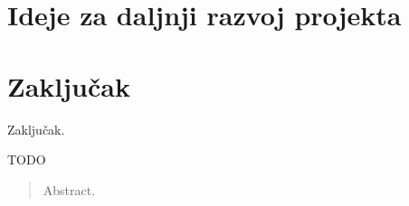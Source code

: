 \documentclass[times, utf8, zavrsni]{fer}
\begin{document}
\chapter{Ideje za daljnji razvoj projekta}

\chapter{Zaključak}
Zaključak.




\begin{sazetak}
TODO

\end{sazetak}

\begin{abstract}
Abstract.

\end{abstract}
\end{document}

